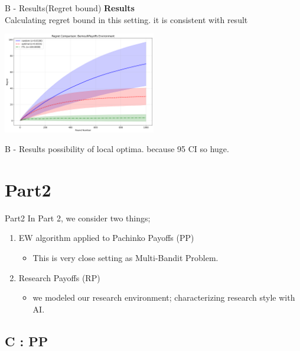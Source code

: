 \documentclass{beamer}
\begin{document}
\begin{frame}{B - Results(Regret bound)}
\textbf{Results}\\
Calculating regret bound in this setting. it is consistent with result
\begin{center}
    \includegraphics[width=0.5\textwidth]{332Project2/figures/bernoulli_regret_comparison.png}
\end{center}
\end{frame}

\begin{frame}{B - Results}
possibility of local optima.
because 95 CI so huge.
    
\end{frame}



\section{Part2}

\begin{frame}{Part2}
In Part 2, we consider two things;
\begin{enumerate}
    \item EW algorithm applied to Pachinko Payoffs (PP)
    \begin{itemize}
        \item This is very close setting as Multi-Bandit Problem.
    \end{itemize}
    \item Research Payoffs (RP)
    \begin{itemize}
        \item we modeled our research environment; characterizing research style with AI.
    \end{itemize}
\end{enumerate}
    
\end{frame}

\subsection{C : PP}
\end{document}
